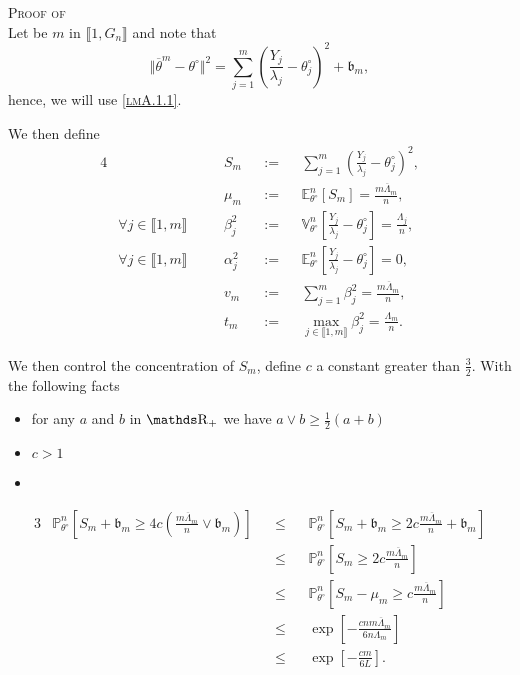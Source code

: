 \begin{pro}{\textsc{Proof of } \\}\label{proB.2.1}
Let be $m$ in $\llbracket 1, G_{n} \rrbracket$ and note that
\[\Vert \overline{\theta}^{m} - \theta^{\circ} \Vert^{2} = \sum\limits_{j = 1}^{m} \left(\frac{Y_{j}}{\lambda_{j}} - \theta^{\circ}_{j}\right)^{2} + \mathfrak{b}_{m},\]
hence, we will use \textsc{\cref{lmA.1.1}}.

We then define 
\begin{alignat*}{4}
& && S_{m} && := && \sum\limits_{j = 1}^{m} \left(\frac{Y_{j}}{\lambda_{j}} - \theta^{\circ}_{j}\right)^{2},\\
& && \mu_{m} && := && \mathds{E}_{\theta^{\circ}}^{n}\left[S_{m}\right] = \frac{m \overline{\Lambda}_{m}}{n},\\
& \forall j \in \llbracket 1, m \rrbracket \quad && \beta_{j}^{2} && := && \mathds{V}_{\theta^{\circ}}^{n}\left[\frac{Y_{j}}{\lambda_{j}} - \theta^{\circ}_{j}\right] = \frac{\Lambda_{j}}{n},\\
& \forall j \in \llbracket 1, m \rrbracket \quad && \alpha_{j}^{2} && := && \mathds{E}_{\theta^{\circ}}^{n}\left[\frac{Y_{j}}{\lambda_{j}} - \theta^{\circ}_{j}\right] = 0,\\
& && v_{m} && := && \sum\limits_{j = 1}^{m}\beta_{j}^{2} = \frac{m \overline{\Lambda}_{m}}{n},\\
& && t_{m} && := && \max\limits_{j \in \llbracket 1, m \rrbracket}\beta_{j}^{2} = \frac{\Lambda_{m}}{n}.
\end{alignat*}

We then control the concentration of $S_{m}$, define $c$ a constant greater than $\frac{3}{2}$.
With the following facts
\begin{itemize}
\item for any $a$ and $b$ in $\R_{+}$ we have $a \vee b \geq \frac{1}{2} \left(a + b\right)$
\item $c > 1$
\item {}
\end{itemize}

\begin{alignat*}{3}
& \mathds{P}_{\theta^{\circ}}^{n}\left[S_{m} + \mathfrak{b}_{m} \geq 4 c \left(\frac{m \overline{\Lambda}_{m}}{n} \vee \mathfrak{b}_{m}\right) \right] && \leq && \mathds{P}_{\theta^{\circ}}^{n}\left[S_{m} + \mathfrak{b}_{m} \geq 2 c \frac{m \overline{\Lambda}_{m}}{n} + \mathfrak{b}_{m} \right]\\
& && \leq && \mathds{P}_{\theta^{\circ}}^{n}\left[S_{m} \geq 2 c \frac{m \overline{\Lambda}_{m}}{n}\right]\\
& && \leq && \mathds{P}_{\theta^{\circ}}^{n}\left[S_{m} - \mu_{m} \geq c \frac{m \overline{\Lambda}_{m}}{n}\right]\\
& && \leq && \exp\left[- \frac{c n m \overline{\Lambda}_{m}}{6 n \Lambda_{m}}\right]\\
& && \leq && \exp\left[- \frac{c m}{6 L}\right].
\end{alignat*}
\end{pro}

